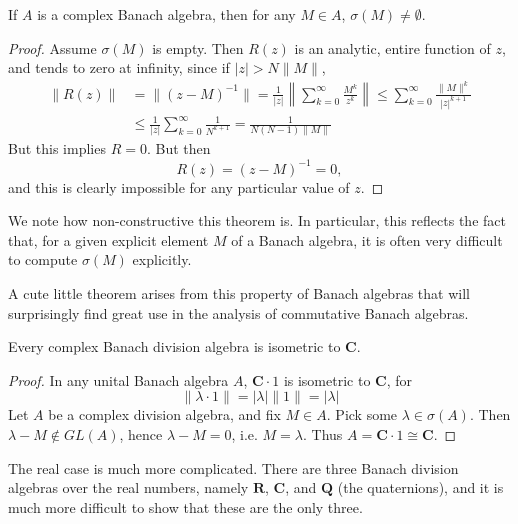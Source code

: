 \begin{theorem} If $A$ is a complex Banach algebra, then for any $M \in A$, $\sigma(M) \neq \emptyset$.
\end{theorem}
\begin{proof}
    Assume $\sigma(M)$ is empty. Then $R(z)$ is an analytic, entire function of $z$, and tends to zero at infinity, since if $|z| > N \| M \|$,
    \begin{align*}
        \| R(z) \| &= \| (z - M)^{-1} \| = \frac{1}{|z|} \left\| \sum_{k = 0}^\infty \frac{M^k}{z^k} \right\| \leq \sum_{k = 0}^\infty \frac{\| M \|^k}{|z|^{k+1}}\\
        &\leq \frac{1}{|z|} \sum_{k = 0}^\infty \frac{1}{N^{k+1}} = \frac{1}{N(N - 1)\|M\|}
    \end{align*}
    But this implies $R = 0$. But then
    \[ R(z) = (z - M)^{-1} = 0, \]
    and this is clearly impossible for any particular value of $z$.
\end{proof}

\begin{remark}
    We note how non-constructive this theorem is. In particular, this reflects the fact that, for a given explicit element $M$ of a Banach algebra, it is often very difficult to compute $\sigma(M)$ explicitly.
\end{remark}

A cute little theorem arises from this property of Banach algebras that will surprisingly find great use in the analysis of commutative Banach algebras.

\begin{corollary}
    Every complex Banach division algebra is isometric to $\mathbf{C}$.
\end{corollary}
\begin{proof}
    In any unital Banach algebra $A$, $\mathbf{C} \cdot 1$ is isometric to $\mathbf{C}$, for
    \[ \| \lambda \cdot 1 \| = |\lambda| \| 1 \| = |\lambda| \]
    Let $A$ be a complex division algebra, and fix $M \in A$. Pick some $\lambda \in \sigma(A)$. Then $\lambda - M \not \in GL(A)$, hence $\lambda - M = 0$, i.e. $M = \lambda$. Thus $A = \mathbf{C} \cdot 1 \cong \mathbf{C}$.
\end{proof}

The real case is much more complicated. There are three Banach division algebras over the real numbers, namely $\mathbf{R}$, $\mathbf{C}$, and $\mathbf{Q}$ (the quaternions), and it is much more difficult to show that these are the only three.

